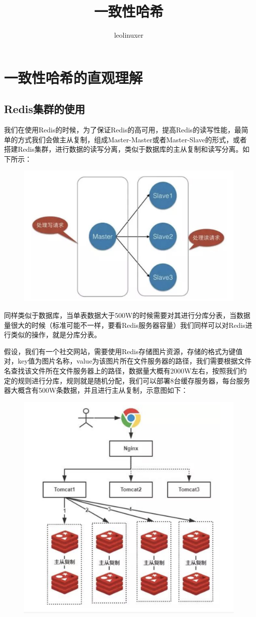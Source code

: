 \documentclass[12pt]{article}
\title{一致性哈希\cite{For_Interview_What_Is_Consistent_Hashing}}
\author{leolinuxer}
\begin{document}
\maketitle
\tableofcontents

\section{一致性哈希的直观理解}
\subsection{Redis集群的使用}
我们在使用Redis的时候，为了保证Redis的高可用，提高Redis的读写性能，最简单的方式我们会做主从复制，组成Master-Master或者Master-Slave的形式，或者搭建Redis集群，进行数据的读写分离，类似于数据库的主从复制和读写分离。如下所示：
\begin{figure}[H]
    \centering
    \includegraphics[width=.4\textwidth]{fig/Consistent_Hashing_1.png}
\end{figure}

同样类似于数据库，当单表数据大于500W的时候需要对其进行分库分表，当数据量很大的时候（标准可能不一样，要看Redis服务器容量）我们同样可以对Redis进行类似的操作，就是分库分表。

假设，我们有一个社交网站，需要使用Redis存储图片资源，存储的格式为键值对，key值为图片名称，value为该图片所在文件服务器的路径，我们需要根据文件名查找该文件所在文件服务器上的路径，数据量大概有2000W左右，按照我们约定的规则进行分库，规则就是随机分配，我们可以部署8台缓存服务器，每台服务器大概含有500W条数据，并且进行主从复制，示意图如下：
\begin{figure}[H]
    \centering
    \includegraphics[width=.4\textwidth]{fig/Consistent_Hashing_2.png}
\end{figure}
\end{document}
